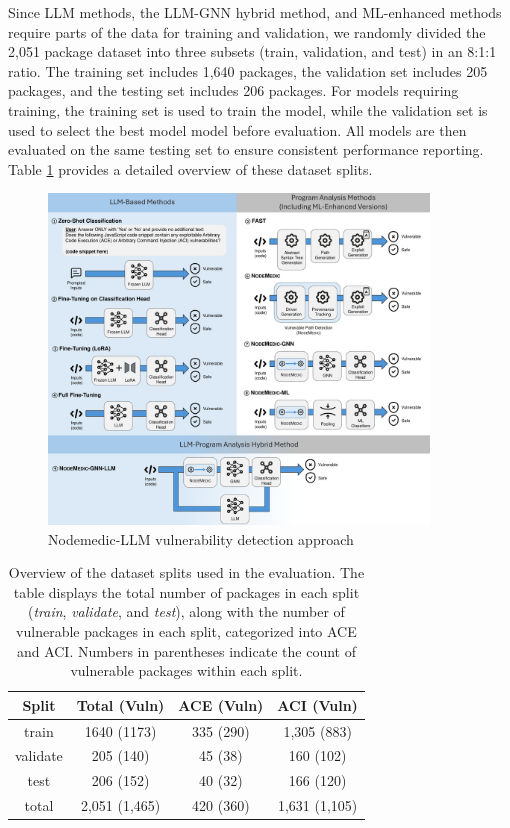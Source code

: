 \documentclass[12pt,openany,oneside,table]{cmuthesis}
\begin{document}
Since LLM methods, the LLM-GNN hybrid method, and ML-enhanced \nodemedicfine methods require parts of the data for training and validation, we randomly divided the 2,051 package dataset into three subsets (train, validation, and test) in an 8:1:1 ratio. The training set includes 1,640 packages, the validation set includes 205 packages, and the testing set includes 206 packages.
For models requiring training, the training set is used to train the model, while the validation set is used to select the best model model before evaluation. All models are then evaluated on the same testing set to ensure consistent performance reporting.
Table \ref{tab:dataset-overview} provides a detailed overview of these dataset splits.

\begin{figure}[t]
    \centering
    \includegraphics[width=0.9\textwidth]{figures/approach/nodemedic.pdf}
    \caption{Nodemedic-LLM vulnerability detection approach}
    \label{fig:nodemedic}
\end{figure}


\begin{table}[t]
\centering
\caption{Overview of the dataset splits used in the evaluation. The table displays the total number of packages in each split (\textit{train}, \textit{validate}, and \textit{test}), along with the number of vulnerable packages in each split, categorized into ACE and ACI. Numbers in parentheses indicate the count of vulnerable packages within each split.
}
\label{tab:dataset-overview}
\begin{tabular}{|c|c|c|c|}
\hline
\textbf{Split} & \textbf{Total (Vuln)} & \textbf{ACE (Vuln)} & \textbf{ACI (Vuln)} \\ \hline
train & 1640 (1173) & 335 (290) & 1,305 (883) \\ \hline
validate & 205 (140) & 45 (38) & 160 (102) \\ \hline
test & 206 (152) & 40 (32) & 166 (120) \\ \hline
total & 2,051 (1,465) & 420 (360) & 1,631 (1,105) \\ \hline
\end{tabular}
\end{table}
\end{document}
